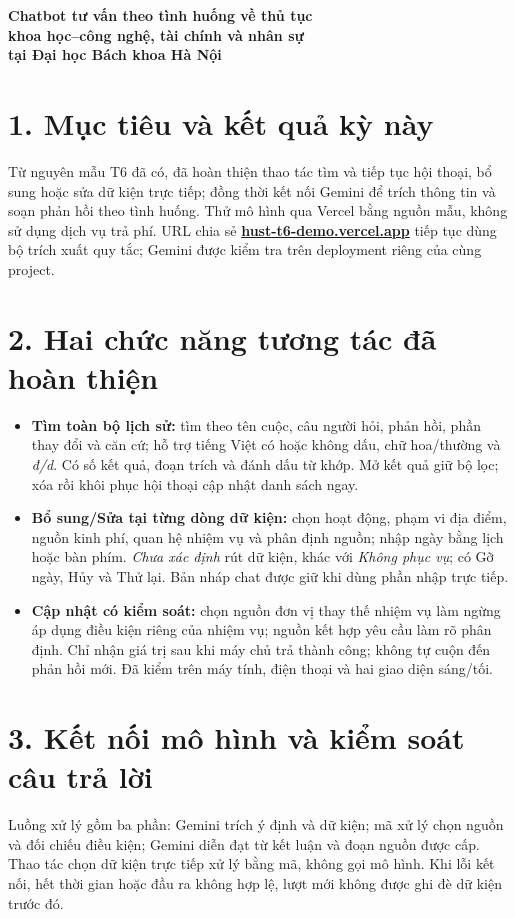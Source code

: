 \documentclass[12pt,a4paper]{article}
\begin{document}
\begin{center}
{\Large\bfseries Chatbot tư vấn theo tình huống về thủ tục\\
khoa học--công nghệ, tài chính và nhân sự\\
tại Đại học Bách khoa Hà Nội}
\end{center}

\section*{1. Mục tiêu và kết quả kỳ này}
Từ nguyên mẫu T6 đã có, đã hoàn thiện thao tác tìm và tiếp tục hội thoại, bổ sung hoặc sửa dữ kiện trực tiếp; đồng thời kết nối Gemini để trích thông tin và soạn phản hồi theo tình huống. Thử mô hình qua Vercel bằng nguồn mẫu, không sử dụng dịch vụ trả phí. URL chia sẻ \href{https://hust-t6-demo.vercel.app}{\textbf{hust-t6-demo.vercel.app}} tiếp tục dùng bộ trích xuất quy tắc; Gemini được kiểm tra trên deployment riêng của cùng project.

\section*{2. Hai chức năng tương tác đã hoàn thiện}
\begin{itemize}
\item \textbf{Tìm toàn bộ lịch sử:} tìm theo tên cuộc, câu người hỏi, phản hồi, phần thay đổi và căn cứ; hỗ trợ tiếng Việt có hoặc không dấu, chữ hoa/thường và \emph{đ/d}. Có số kết quả, đoạn trích và đánh dấu từ khớp. Mở kết quả giữ bộ lọc; xóa rồi khôi phục hội thoại cập nhật danh sách ngay.
\item \textbf{Bổ sung/Sửa tại từng dòng dữ kiện:} chọn hoạt động, phạm vi địa điểm, nguồn kinh phí, quan hệ nhiệm vụ và phân định nguồn; nhập ngày bằng lịch hoặc bàn phím. \emph{Chưa xác định} rút dữ kiện, khác với \emph{Không phục vụ}; có Gỡ ngày, Hủy và Thử lại. Bản nháp chat được giữ khi dùng phần nhập trực tiếp.
\item \textbf{Cập nhật có kiểm soát:} chọn nguồn đơn vị thay thế nhiệm vụ làm ngừng áp dụng điều kiện riêng của nhiệm vụ; nguồn kết hợp yêu cầu làm rõ phân định. Chỉ nhận giá trị sau khi máy chủ trả thành công; không tự cuộn đến phản hồi mới. Đã kiểm trên máy tính, điện thoại và hai giao diện sáng/tối.
\end{itemize}

\section*{3. Kết nối mô hình và kiểm soát câu trả lời}
Luồng xử lý gồm ba phần: Gemini trích ý định và dữ kiện; mã xử lý chọn nguồn và đối chiếu điều kiện; Gemini diễn đạt từ kết luận và đoạn nguồn được cấp. Thao tác chọn dữ kiện trực tiếp xử lý bằng mã, không gọi mô hình. Khi lỗi kết nối, hết thời gian hoặc đầu ra không hợp lệ, lượt mới không được ghi đè dữ kiện trước đó.
\end{document}
